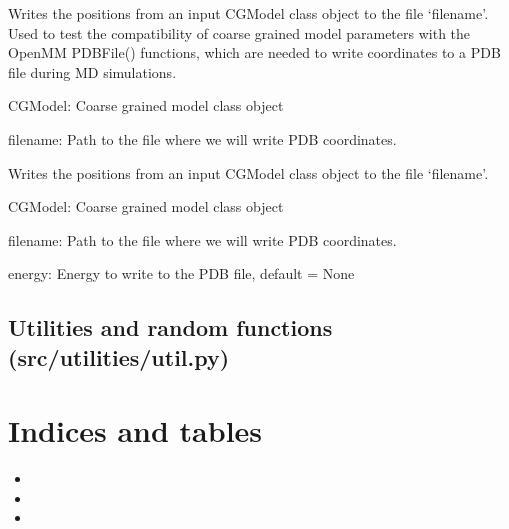 \documentclass[letterpaper,12pt,english,openany,oneside]{sphinxmanual}
\begin{document}

\begin{fulllineitems}
\label{\detokenize{utilities:utilities.iotools.write_cg_pdb}}
Writes the positions from an input CGModel class object to the file ‘filename’.  Used to test the compatibility of coarse grained model parameters with the OpenMM PDBFile() functions, which are needed to write coordinates to a PDB file during MD simulations.

CGModel: Coarse grained model class object

filename: Path to the file where we will write PDB coordinates.

\end{fulllineitems}


\begin{fulllineitems}
\label{\detokenize{utilities:utilities.iotools.write_pdbfile_without_topology}}
Writes the positions from an input CGModel class object to the file ‘filename’.

CGModel: Coarse grained model class object

filename: Path to the file where we will write PDB coordinates.

energy: Energy to write to the PDB file, default = None

\end{fulllineitems}



\section{Utilities and random functions (src/utilities/util.py)}
\label{\detokenize{utilities:utilities-and-random-functions-src-utilities-util-py}}

\chapter{Indices and tables}
\label{\detokenize{index:indices-and-tables}}\begin{itemize}
\item {} 

\item {} 

\item {} 

\end{itemize}
\end{document}
